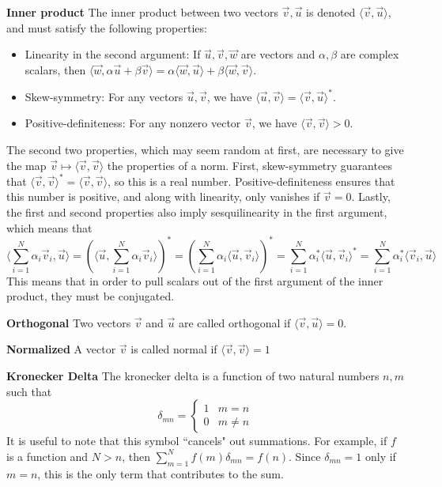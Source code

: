 \documentclass{article}
\begin{document}
\textbf{Inner product}
The inner product between two vectors $\vec v, \vec u$ is denoted $\langle \vec v, \vec u\rangle$, and must satisfy the following properties:
\begin{itemize}
\item Linearity in the second argument: If $\vec u, \vec v, \vec w$ are vectors and $\alpha, \beta$ are complex scalars, then $\langle \vec w, \alpha \vec u + \beta \vec v \rangle = \alpha\langle \vec w, \vec u\rangle + \beta \langle \vec w, \vec v\rangle$.
\item Skew-symmetry: For any vectors $\vec u, \vec v$, we have $\langle \vec u, \vec v \rangle = \langle \vec v, \vec u\rangle^\ast$.
\item Positive-definiteness: For any nonzero vector $\vec v$, we have $\langle \vec v, \vec v \rangle > 0$.
\end{itemize}
The second two properties, which may seem random at first, are necessary to give the map $\vec v \mapsto \langle \vec v, \vec v\rangle$ the properties of a norm. First, skew-symmetry guarantees that $\langle \vec v, \vec v \rangle^\ast = \langle \vec v, \vec v\rangle$, so this is a real number. Positive-definiteness ensures that this number is positive, and along with linearity, only vanishes if $\vec v = 0$. Lastly, the first and second properties also imply sesquilinearity in the first argument, which means that
$$
\langle \sum_{i=1}^N \alpha_i \vec v_i, \vec u\rangle = \left(\langle \vec u, \sum_{i=1}^N \alpha_i \vec v_i\rangle\right)^\ast = \left(\sum_{i=1}^N \alpha_i\langle \vec u,  \vec v_i\rangle\right)^\ast = \sum_{i=1}^N \alpha_i^\ast\langle \vec u,  \vec v_i\rangle^\ast = \sum_{i=1}^N \alpha_i^\ast\langle \vec v_i, \vec u\rangle
$$
This means that in order to pull scalars out of the first argument of the inner product, they must be conjugated.

\textbf{Orthogonal}
Two vectors $\vec v$ and $\vec u$ are called orthogonal if $\langle \vec v, \vec u \rangle = 0$.

\textbf{Normalized}
A vector $\vec v$ is called normal if $\langle \vec v, \vec v \rangle = 1$

\textbf{Kronecker Delta}
The kronecker delta is a function of two natural numbers $n,m$ such that
\[
\delta_{mn} = 
\begin{cases}
1 & m = n\\
0 & m \neq n
\end{cases}
\]
It is useful to note that this symbol ``cancels" out summations. For example, if $f$ is a function and $N > n$, then $\sum_{m=1}^Nf(m)\delta_{mn} = f(n)$. Since $\delta_{mn} = 1$ only if $m=n$, this is the only term that contributes to the sum.
\end{document}
